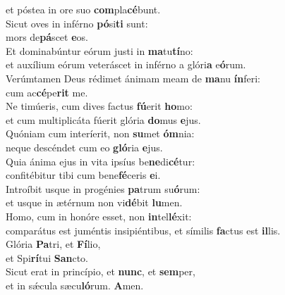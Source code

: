 \oddverse et póstea in ore suo \textbf{com}pla\textbf{cé}bunt.\\
\evenverse Sicut oves in inférno \textbf{pó}si\textbf{ti} sunt:~\*\\
\evenverse mors de\textbf{pá}scet \textbf{e}os.\\
\oddverse Et dominabúntur eórum justi in \textbf{ma}tu\textbf{tí}no:~\*\\
\oddverse et auxílium eórum veteráscet in inférno a glóri\textbf{a} e\textbf{ó}rum.\\
\evenverse Verúmtamen Deus rédimet ánimam meam de \textbf{ma}nu \textbf{ín}feri:~\*\\
\evenverse cum ac\textbf{cé}pe\textbf{rit} me.\\
\oddverse Ne timúeris, cum dives factus \textbf{fú}erit \textbf{ho}mo:~\*\\
\oddverse et cum multiplicáta fúerit glória \textbf{do}mus \textbf{e}jus.\\
\evenverse Quóniam cum interíerit, non \textbf{su}met \textbf{óm}nia:~\*\\
\evenverse neque descéndet cum eo \textbf{gló}ria \textbf{e}jus.\\
\oddverse Quia ánima ejus in vita ipsíus be\textbf{ne}di\textbf{cé}tur:~\*\\
\oddverse confitébitur tibi cum bene\textbf{fé}ceris \textbf{e}i.\\
\evenverse Introíbit usque in progénies \textbf{pa}trum su\textbf{ó}rum:~\*\\
\evenverse et usque in ætérnum non vi\textbf{dé}bit \textbf{lu}men.\\
\oddverse Homo, cum in honóre esset, non \textbf{in}tel\textbf{lé}xit:~\*\\
\oddverse comparátus est juméntis insipiéntibus, et símilis \textbf{fa}ctus est \textbf{il}lis.\\
\evenverse Glória \textbf{Pa}tri, et \textbf{Fí}lio,~\*\\
\evenverse et Spi\textbf{rí}tui \textbf{San}cto.\\
\oddverse Sicut erat in princípio, et \textbf{nunc}, et \textbf{sem}per,~\*\\
\oddverse et in sǽcula sæcu\textbf{ló}rum. \textbf{A}men.\\
